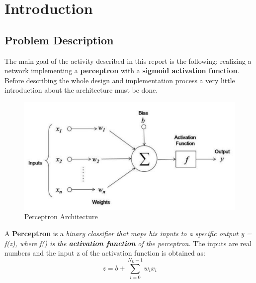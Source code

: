 \section{Introduction}
\subsection{Problem Description}
The main goal of the activity described in this report is the following: realizing a network implementing a \textbf{perceptron} with a \textbf{sigmoid activation function}.\\
Before describing the whole design and implementation process a very little introduction about the architecture must be done.\\

\begin{figure}[h]
	\centering
	\includegraphics[width=\textwidth]{img/perceptron.png}
	\caption{Perceptron Architecture}
\end{figure}

A \textbf{Perceptron} is a \textit{binary classifier that maps his inputs to a specific output y = f(z), where f() is the \textbf{activation function} of the perceptron.} The inputs are real numbers and the input z of the activation function is obtained as:\\
\begin{equation}
	z = b + \sum_{i = 0}^{N_{L}-1}w_{i}x_{i}
\end{equation}

